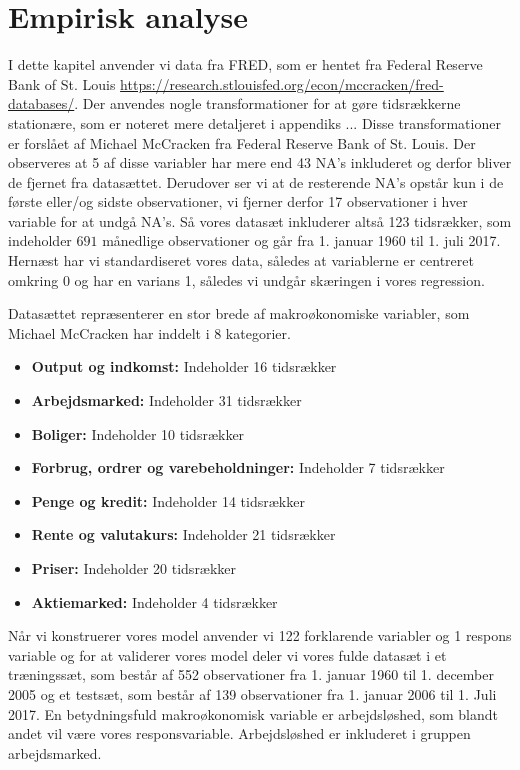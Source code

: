 \chapter{Empirisk analyse}
I dette kapitel anvender vi data fra FRED, som er hentet fra Federal Reserve Bank of St. Louis \url{https://research.stlouisfed.org/econ/mccracken/fred-databases/}.
Der anvendes nogle transformationer for at gøre tidsrækkerne stationære, som er noteret mere detaljeret i appendiks ... 
Disse transformationer er forslået af Michael McCracken fra Federal Reserve Bank of St. Louis.  
Der observeres at 5 af disse variabler har mere end 43 NA's inkluderet og derfor bliver de fjernet fra datasættet. 
Derudover ser vi at de resterende NA's opstår kun i de første eller/og sidste observationer, vi fjerner derfor 17 observationer i hver variable for at undgå NA's. 
Så vores datasæt inkluderer altså 123 tidsrækker, som indeholder $691$ månedlige observationer og går fra 1. januar 1960 til 1. juli 2017. 
Hernæst har vi standardiseret vores data, således at variablerne er centreret omkring 0 og har en varians 1, således vi undgår skæringen i vores regression. 

Datasættet repræsenterer en stor brede af makroøkonomiske variabler, som Michael McCracken har inddelt i 8 kategorier. 
\begin{itemize}
\item \textbf{Output og indkomst:} Indeholder 16 tidsrækker
\item \textbf{Arbejdsmarked:}  Indeholder 31 tidsrækker
\item \textbf{Boliger:} Indeholder 10 tidsrækker
\item \textbf{Forbrug, ordrer og varebeholdninger:} Indeholder 7 tidsrækker
\item \textbf{Penge og kredit:} Indeholder 14 tidsrækker
\item\textbf{ Rente og valutakurs:} Indeholder 21 tidsrækker
\item \textbf{Priser:} Indeholder 20 tidsrækker
\item \textbf{Aktiemarked:} Indeholder 4 tidsrækker
\end{itemize}

Når vi konstruerer vores model anvender vi 122 forklarende variabler og 1 respons variable og for at validerer vores model deler vi vores fulde datasæt i et træningssæt, som består af 552 observationer fra 1. januar 1960 til 1. december 2005 og et testsæt, som består af 139 observationer fra 1. januar 2006 til 1. Juli 2017. 
En betydningsfuld makroøkonomisk variable er arbejdsløshed, som blandt andet vil være vores responsvariable.  Arbejdsløshed er inkluderet i gruppen arbejdsmarked. 
